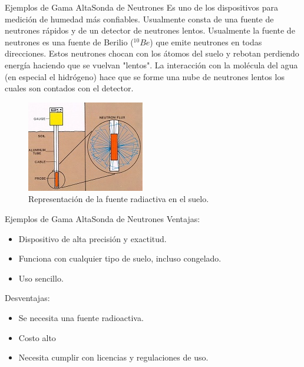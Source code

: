 \documentclass[]{beamer}
\begin{document}
\begin{frame}{Ejemplos de Gama Alta}{Sonda de Neutrones}
Es uno de los dispositivos para medición de humedad más confiables. Usualmente consta de una fuente de neutrones rápidos y de un detector de neutrones lentos. Usualmente la fuente de neutrones es una fuente de Berilio ($^{10}Be$) que emite neutrones en todas direcciones. Estos neutrones chocan con los átomos del suelo y rebotan perdiendo energía haciendo que se vuelvan "lentos". La interacción con la molécula del agua (en especial el hidrógeno) hace que se forme una nube de neutrones lentos los cuales son contados con el detector.

\begin{figure}
  \includegraphics[height=0.4\textheight]{Docs/sondaneutrones2}
  \caption{Representación de la fuente radiactiva en el suelo.}
  \label{}
\end{figure}

\end{frame}

\begin{frame}{Ejemplos de Gama Alta}{Sonda de Neutrones}
Ventajas:

\begin{itemize}
  \item Dispositivo de alta precisión y exactitud.
  \item Funciona con cualquier tipo de suelo, incluso congelado.
  \item Uso sencillo.
\end{itemize}

Desventajas:
\begin{itemize}
   \item Se necesita una fuente radioactiva.
   \item Costo alto
   \item Necesita cumplir con licencias y regulaciones de uso.
\end{itemize}

\end{frame}
\end{document}
